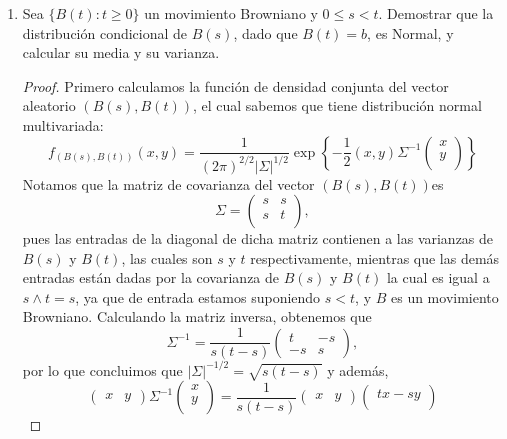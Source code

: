 \documentclass[letterpaper]{article}
\newcommand{\1}{\mathds{1}}
\theoremstyle{definition}
\theoremstyle{definition}
\theoremstyle{definition}
\theoremstyle{definition}
\theoremstyle{definition}
\begin{document}
\begin{enumerate}
\begin{proof}
    \end{proof}
    \item Sea $\{B(t):t\geq0\}$ un movimiento Browniano y $0\leq s<t$.
    Demostrar que la distribución condicional de $B(s)$, dado que $B(t)=b$, es
    Normal, y calcular su media y su varianza.
    \begin{proof} 
     Primero calculamos la función de densidad conjunta del vector aleatorio $(B(s),B(t))$, el cual sabemos que tiene distribución normal multivariada:
     \[
     f_{\left(B(s),B(t)\right)}(x,y)=\frac{1}{(2\pi)^{2/2}|\Sigma|^{1/2}}\exp\left\{-\frac{1}{2}(x,y)\Sigma^{-1}\begin{pmatrix}
        x\\
        y\\
     \end{pmatrix}\right\}   
     \] 
     Notamos que la matriz de covarianza del vector $(B(s),B(t))$es 
     \[\Sigma=
     \begin{pmatrix}
        s & s\\
        s & t\\
     \end{pmatrix},   
     \]
     pues las entradas de la diagonal de dicha matriz contienen a las varianzas de $B(s)$ y $B(t)$, las cuales son $s$ y $t$ respectivamente,
     mientras que las demás entradas están dadas por la covarianza de $B(s)$ y $B(t)$
     la cual es igual a $s\wedge t=s$, ya que de entrada estamos suponiendo $s<t$, y $B$ es un movimiento Browniano. Calculando la
     matriz inversa, obtenemos que
     \[
        \Sigma^{-1}=\frac{1}{s(t-s)}
     \begin{pmatrix}
        t & -s\\
        -s & s
     \end{pmatrix},   
     \]
     por lo que concluimos que $|\Sigma|^{-1/2}=\sqrt{s(t-s)}$ y además,
     \[
        \begin{pmatrix}
            x & y
        \end{pmatrix}
        \Sigma^{-1}
        \begin{pmatrix}
            x\\
            y\\
        \end{pmatrix}
        =\frac{1}{s(t-s)}
        \begin{pmatrix}
            x & y
        \end{pmatrix}
        \begin{pmatrix}
            tx-sy\\

\end{pmatrix}\]
\end{proof}
\end{enumerate}
\end{document}
